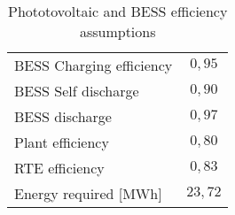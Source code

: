 \begin{table}[h!]
\centering
\begin{tabular}{|lc|}
\hline
\rowcolor{bluepoli!40}\multicolumn{2}{|c|}{\textbf{Efficiency assumptions}}                 \\ \hline
\multicolumn{1}{|l|}{BESS Charging efficiency}   & \textbf{$0,95$}                          \\ \hline
\multicolumn{1}{|l|}{BESS Self discharge}        & \textbf{$0,90$}                          \\ \hline
\multicolumn{1}{|l|}{BESS discharge}             & \textbf{$0,97$}                          \\ \hline
\multicolumn{1}{|l|}{Plant efficiency}           & \textbf{$0,80$}                          \\ \hline
\multicolumn{1}{|l|}{RTE efficiency}             & \textbf{$0,83$}                          \\ \hline
\multicolumn{1}{|l|}{Energy required {[}MWh{]}}  & \textbf{$23,72$}                         \\ \hline
\end{tabular}
\caption{Phototovoltaic and BESS efficiency assumptions}
\label{tab:pvbessass}
\end{table}